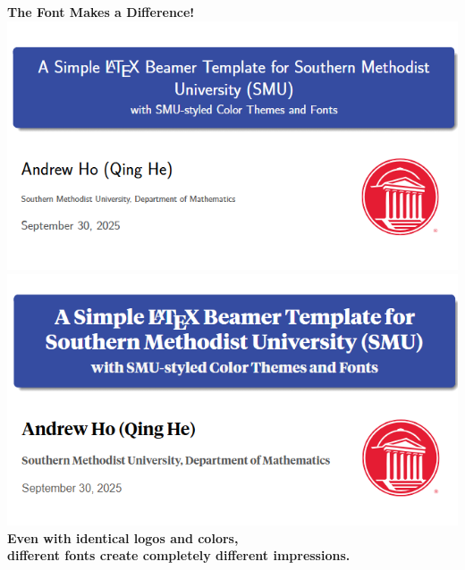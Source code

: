 \documentclass[12pt, aspectratio=169]{beamer}
\begin{document}
\begin{frame}{\insertsubsection}
\centering
{\huge \bf \serif The Font Makes a Difference!}\\
\includegraphics[height=0.45\textheight]{template-source/template_without_font.png}
\includegraphics[height=0.45\textheight]{template-source/template_with_font.png}\\
\textbf{Even with identical logos and colors, \\different fonts create completely different impressions.}
\end{frame}
\end{document}
